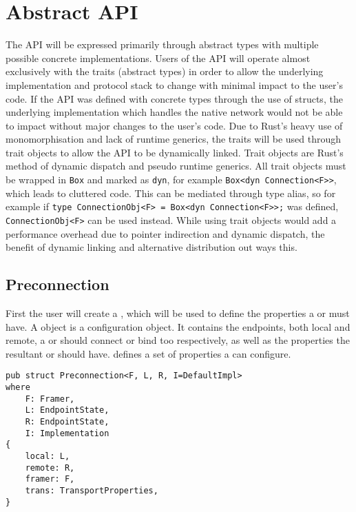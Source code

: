 \section{Abstract API}\label{sec:abstract-api}
The API will be expressed primarily through abstract types with multiple possible concrete implementations.
Users of the API will operate almost exclusively with the traits (abstract types) in order to allow the underlying
implementation and protocol stack to change with minimal impact to the user's code.
If the API was defined with concrete types through the use of structs, the underlying implementation which handles
the native network would not be able to impact without major changes to the user's code.
Due to Rust's heavy use of monomorphisation and lack of runtime generics, the traits will be used through trait objects
to allow the API to be dynamically linked.
Trait objects are Rust's method of dynamic dispatch and pseudo runtime generics.
All trait objects must be wrapped in \texttt{Box} and marked as \texttt{dyn}, for example
\texttt{Box<dyn Connection<F>>}, which leads to cluttered code.
This can be mediated through type alias, so for example if \texttt{type ConnectionObj<F> = Box<dyn Connection<F>{}>;} was
defined, \texttt{ConnectionObj<F>} can be used instead.
While using trait objects would add a performance overhead due to pointer indirection and dynamic dispatch, the benefit
of dynamic linking and alternative distribution out ways this.

\subsection{Preconnection}\label{subsec:preconnection}
First the user will create a \preconnection{}, which will be used to define the properties a \connection or \listener
must have.
A \preconnection{} object is a configuration object.
It contains the endpoints, both local and remote, a \connection{} or \listener{} should connect or bind too
respectively, as well as the properties the resultant \connection{} or \listener{} should have.
\cite[§~5.2]{trammell_abstractapplicationlayer_2020} defines a set of properties a \preconnection{} can configure.

\begin{lstlisting}[float=h, label=lst:preconnection, caption={The Preconnection struct, showing the four
generic parameters.}]
pub struct Preconnection<F, L, R, I=DefaultImpl>
where
    F: Framer,
    L: EndpointState,
    R: EndpointState,
    I: Implementation
{
    local: L,
    remote: R,
    framer: F,
    trans: TransportProperties,
}
\end{lstlisting}

